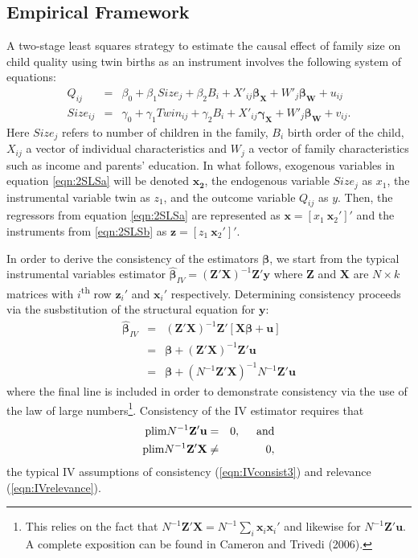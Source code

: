 \documentclass{article}[11pt,subeqn]
\newcommand{\vect}[1]{\mathbf{#1}}
\begin{document}
\begin{spacing}{1.25}
\section{Empirical Framework}
\label{scn:EF}
A two-stage least squares strategy to estimate the causal effect of family size on child quality using twin births as an instrument involves the following system of equations:
\begin{subequations}
\label{eqn:2SLS}
\begin{eqnarray}
\label{eqn:QQ}
Q_{ij}&=&\beta_0+\beta_1Size_j+\beta_2B_{i}+X'_{ij}\vect{\beta_{\vect{X}}}+W'_j\vect{\beta_\vect{W}}+u_{ij} \label{eqn:2SLSa}\\
Size_{ij}&=&\gamma_0+\gamma_1Twin_{ij}+\gamma_2B_{i}+X'_{ij}\vect{\gamma_\vect{X}}+W'_j\vect{\beta_\vect{W}}+v_{ij}. \label{eqn:2SLSb}
 \end{eqnarray}
\end{subequations}
Here $Size_j$ refers to number of children in the family, $B_i$ birth order of the child, $X_{ij}$ a vector
of individual characteristics and $W_j$ a vector of family characteristics such as income and parents' education.
In what follows, exogenous variables in equation \ref{eqn:2SLSa} will be denoted $\mathbf{x_2}$, the
endogenous variable $Size_j$ as $x_1$, the instrumental variable twin as $z_1$, and the outcome variable
$Q_{ij}$ as $y$.  Then, the regressors from equation \ref{eqn:2SLSa} are represented as
$\vect{x}=[x_1\ \vect{x}_2']'$ and the instruments from \ref{eqn:2SLSb} as $\vect{z}=[z_1\ \vect{x}_2']'$.

In order to derive the consistency of the estimators $\vect{\beta}$, we start from the typical instrumental variables estimator
$\vect{\hat{\beta}}_{IV}=(\vect{Z}'\vect{X})^{-1}\vect{Z}'\vect{y} $
where $\vect{Z}$ and $\vect{X}$ are $N \times k$ matrices with $i$\textsuperscript{th} row $\vect{z}_i'$ and $\vect{x}_i'$ respectively.  Determining consistency proceeds via the susbstitution of the structural equation for $\vect{y}$:
\begin{eqnarray}
\label{eqn:IVderive}
\vect{\hat{\beta}}_{IV}&=&(\vect{Z}'\vect{X})^{-1}\vect{Z}'[\vect{X\beta}+\vect{u}] \nonumber\\
&=&\vect{\beta}+(\vect{Z}'\vect{X})^{-1}\vect{Z}'\vect{u}\nonumber\\
&=&\vect{\beta}+(N^{-1}\vect{Z}'\vect{X})^{-1}N^{-1}\vect{Z}'\vect{u}
\end{eqnarray}
where the final line is included in order to demonstrate consistency via the use of the law of large numbers\footnote{This relies
on the fact that $N^{-1}\vect{Z}'\vect{X}=N^{-1}\sum_i\vect{x}_i\vect{x}_i'$ and likewise for $N^{-1}\vect{Z}'\vect{u}$.  A
complete exposition can be found in Cameron and Trivedi (2006).}.  Consistency of the IV estimator requires that
\begin{eqnarray}
\mathrm{plim} N^{-1}\vect{Z'u}&=&0, \hspace{5mm}\mathrm{and} \label{eqn:IVconsist3}\\ 
\mathrm{plim} N^{-1}\vect{Z'X}&\neq&0, \label{eqn:IVrelevance}
\end{eqnarray}
the typical IV assumptions of consistency (\ref{eqn:IVconsist3}) and relevance (\ref{eqn:IVrelevance}).  


\end{spacing}
\end{document}
